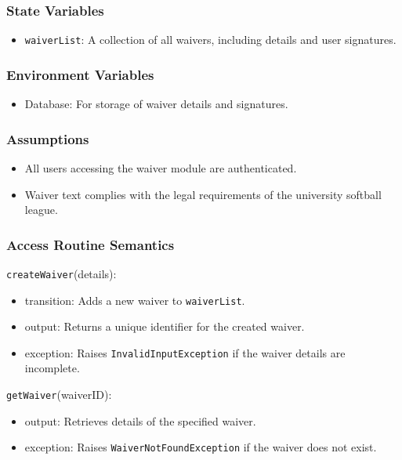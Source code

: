 \documentclass[12pt, titlepage]{article}
\begin{document}
\subsubsection{State Variables}

\begin{itemize}
  \item \texttt{waiverList}: A collection of all waivers, including details and user signatures.
\end{itemize}

\subsubsection{Environment Variables}
\begin{itemize}
  \item Database: For storage of waiver details and signatures.
\end{itemize}

\subsubsection{Assumptions}
\begin{itemize}
  \item All users accessing the waiver module are authenticated.
  \item Waiver text complies with the legal requirements of the university softball league.
\end{itemize}

\subsubsection{Access Routine Semantics}

\noindent \texttt{createWaiver}(details):
\begin{itemize}
  \item transition: Adds a new waiver to \texttt{waiverList}.
  \item output: Returns a unique identifier for the created waiver.
  \item exception: Raises \texttt{InvalidInputException} if the waiver details are incomplete.
\end{itemize}

\noindent \texttt{getWaiver}(waiverID):
\begin{itemize}
  \item output: Retrieves details of the specified waiver.
  \item exception: Raises \texttt{WaiverNotFoundException} if the waiver does not exist.
\end{itemize}
\end{document}
